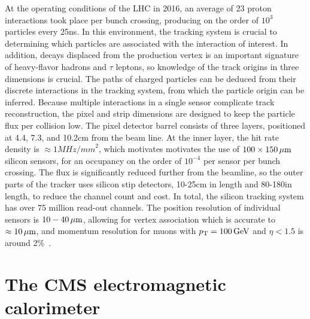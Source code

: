 At the operating conditions of the LHC in 2016, an average of 23 proton
interactions took place per bunch crossing, producing on the order of $10^{3}$ particles
every 25\unit{ns}.
In this environment, the tracking system is crucial to determining which particles are associated
with the interaction of interest. In addition, decays displaced from the
production vertex is an important signature of heavy-flavor hadrons and $\tau$ leptons,
so knowledge of the track origins in three dimensions is crucial.
The paths of charged particles can be deduced from their discrete interactions
in the tracking system, from which the particle origin can be inferred.
Because multiple interactions in a single sensor complicate track reconstruction, the pixel and strip 
dimensions are designed to keep the particle flux per collision low.
The pixel detector barrel consists of three layers, positioned at 4.4, 7.3, and
10.2\unit{cm} from the beam line. At the inner layer,
the hit rate density is $\approx1\unit{MHz/mm}^2$, which motivates 
motivates the use of $100\times150\,\mu\text{m}$ silicon sensors, for an occupancy
on the order of $10^{-4}$ per sensor per bunch crossing. The flux is significantly
reduced further from the beamline, so the outer parts of the tracker uses silicon
stip detectors, 10-25\unit{cm} in length and 80-180\micron in length, to reduce
the channel count and cost. In total, the silicon tracking system has over 75 million read-out channels.
The position resolution of individual sensors is $10-40\,\mu\text{m}$,
allowing for vertex association which is accurate to $\approx10\,\mu\text{m}$, 
and momentum resolution for muons with $p_{\mathrm{T}} = 100\,\text{Ge\hspace{-.08em}V}$
and $\eta < 1.5$ is around 2\%~\cite{Chatrchyan:2014fea}.

\section{The CMS electromagnetic calorimeter}

